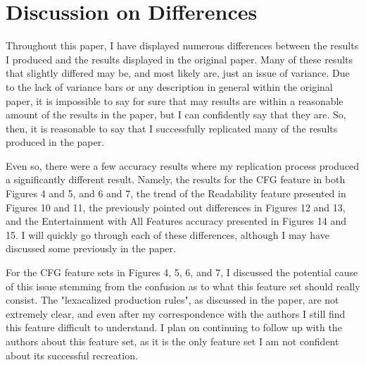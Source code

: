 \documentclass{article}
\begin{document}
\section{Discussion on Differences}

Throughout this paper, I have displayed numerous differences between the results I produced and the results displayed in the original paper. Many of these results that slightly differed may be, and most likely are, just an issue of variance. Due to the lack of variance bars or any description in general within the original paper, it is impossible to say for sure that may results are within a reasonable amount of the results in the paper, but I can confidently say that they are. So, then, it is reasonable to say that I successfully replicated many of the results produced in the paper. 

Even so, there were a few accuracy results where my replication process produced a significantly different result. Namely, the results for the CFG feature in both Figures 4 and 5, and 6 and 7,
the trend of the Readability feature presented in Figures 10 and 11, the previously pointed out differences in Figures 12 and 13, and the Entertainment with All Features accuracy presented in Figures 14 and 15. I will quickly go through each of these differences, although I may have discussed some previously in the paper.

For the CFG feature sets in Figures 4, 5, 6, and 7, I discussed the potential cause of this issue stemming from the confusion as to what this feature set should really consist. The "lexacalized production rules", as discussed in the paper, are not extremely clear, and even after my correspondence with the authors I still find this feature difficult to understand. I plan on continuing to follow up with the authors about this feature set, as it is the only feature set I am not confident about its successful recreation.
\end{document}
